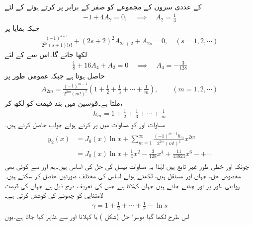  کے عددی سروں کے مجموعے کو صفر کے برابر پر کرتے ہوئے  کے لئے
\begin{align*}
-1+4A_2=0, \quad \implies \quad A_2=\frac{1}{4}
\end{align*}
جبکہ بقایا  پر
\begin{align*}
\frac{(-1)^{s+1}}{2^{2s}(s+1)!s!}+(2s+2)^2A_{2s+2}+A_{2s}=0,\quad (s=1,2,\cdots)
\end{align*}
لکھا جائے گا۔اس سے  کے لئے
\begin{align*}
\frac{1}{8}+16A_4+A_2=0\quad \implies \quad A_4=-\frac{3}{128}
\end{align*}
حاصل ہوتا ہے جبکہ عمومی طور پر
\begin{align}\label{مساوات_بیسل_دوہرا_صفر_ت}
A_{2m}=\frac{(-1)^{m-1}}{2^{2m}(m!)^2}\left(1+\frac{1}{2}+\frac{1}{3}+\cdots+\frac{1}{m}\right), \quad \quad (m=1,2,\cdots)
\end{align}
ملتا ہے۔قوسین میں بند قیمت کو  لکھ کر،
\begin{align}\label{مساوات_بیسل_دوہرا_صفر_ٹ}
h_m=1+\frac{1}{2}+\frac{1}{3}+\cdots+\frac{1}{m}
\end{align}
مساوات  اور  کو مساوات  میں پر کرتے ہوئے جواب حاصل کرتے ہیں۔
\begin{gather}
\begin{aligned}
y_2(x)&=J_0(x)\ln x+\sum_{m=1}^{\infty}\frac{(-1)^{m-1}h_m}{2^{2m}(m!)^2}x^{2m}\\
&=J_0(x)\ln x+\frac{1}{4}x^2-\frac{3}{128}x^4+\frac{11}{\num{13824}}x^6-+\cdots
\end{aligned}
\end{gather}
چونکہ  اور  خطی طور غیر تابع ہیں لہٰذا یہ مساوات بیسل  کی حل کی اساس ہیں۔ہم  اور  سے کوئی بھی مخصوص حل،  جہاں  اور  مستقل ہیں، لکھتے ہوئے اساس کی مختلف صورتیں حاصل کر سکتے ہیں۔روایتی طور پر  اور  چننے جاتے ہیں جہاں   کہلاتا ہے جس کی تعریف درج ذیل ہے جہاں  کی قیمت لامتناہی کو چھونے کی کوشش کرتی ہے۔
\begin{align}
\gamma=1+\frac{1}{2}+\cdots+\frac{1}{s}-\ln s
\end{align}
اس طرح لکھا گیا دوسرا حل  (شکل ) یا  کہلاتا اور  سے ظاہر کیا جاتا ہے۔یوں
